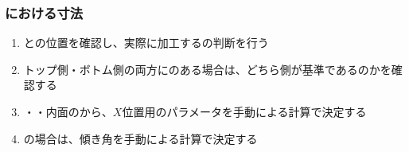 \clearpage
\subsubsection{\OutcutMilling における寸法}
\begin{enumerate}[label=\sarrow]
\item \OutcutLength と\Keyway の位置を確認し、実際に加工する\OutcutLength の判断を行う
\item トップ側・ボトム側の両方に\Outcut のある場合は、どちら側が基準であるのかを確認する
\item \EndFaceID・\OutcutAsideThickness・内面の\PlatingThk から、\OutcutCenter$X$位置用のパラメータを手動による計算で決定する
\item \CurvedOutcut の場合は、傾き角を手動による計算で決定する
\end{enumerate}
